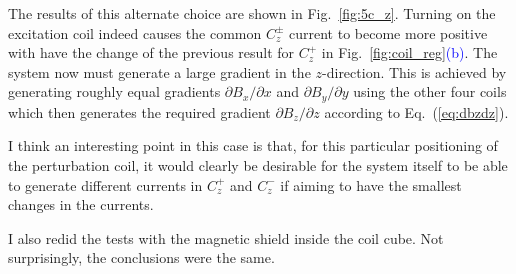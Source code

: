 The results of this alternate choice are shown in Fig.~\ref{fig:5c_z}.
Turning on the excitation coil indeed causes the common $C_z^\pm$
current to become more positive with have the change of the previous
result for $C_z^+$ in Fig.~\ref{fig:coil_reg}\textcolor{blue}{(b)}.  The system now must
generate a large gradient in the $z$-direction.  This is achieved by
generating roughly equal gradients $\partial B_x/\partial x$ and
$\partial B_y/\partial y$ using the other four coils which then
generates the required gradient $\partial B_z/\partial z$ according to
Eq.~(\ref{eq:dbzdz}).

I think an interesting point in this case is that, for this particular
positioning of the perturbation coil, it would clearly be desirable
for the system itself to be able to generate different currents in
$C_z^+$ and $C_z^-$ if aiming to have the smallest changes in the
currents.



I also redid the tests with the magnetic shield inside the coil cube.
Not surprisingly, the conclusions were the same.



